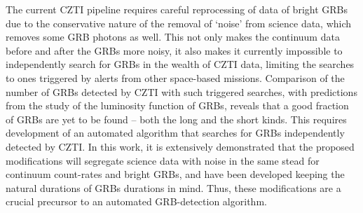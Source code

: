 The current CZTI pipeline requires careful reprocessing of data of bright GRBs due to the conservative nature of the removal of `noise' from science data, which removes some GRB photons as well. This not only makes the continuum data before and after the GRBs more noisy, it also makes it currently impossible to independently search for GRBs in the wealth of CZTI data, limiting the searches to ones triggered by alerts from other space-based missions. Comparison of the number of GRBs detected by CZTI with such triggered searches, with predictions from the study of the luminosity function of GRBs, reveals that a good fraction of GRBs are yet to be found -- both the long \citep{Paul-2018-MNRAS--long} and the short \citep{Paul-2018-MNRAS--short} kinds. This requires development of an automated algorithm that searches for GRBs independently detected by CZTI. In this work, it is extensively demonstrated that the proposed modifications will segregate science data with noise in the same stead for continuum count-rates and bright GRBs, and have been developed keeping the natural durations of GRBs durations in mind. Thus, these modifications are a crucial precursor to an automated GRB-detection algorithm.


